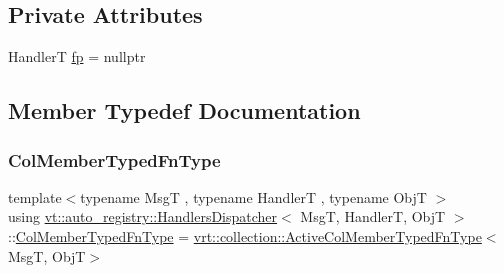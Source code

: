 \subsection*{Private Attributes}
\begin{DoxyCompactItemize}
\item 
HandlerT \hyperlink{structvt_1_1auto__registry_1_1_handlers_dispatcher_a2fe52dbcfedb744c43a0579de7c7167f}{fp} = nullptr
\end{DoxyCompactItemize}


\subsection{Member Typedef Documentation}
\mbox{\label{structvt_1_1auto__registry_1_1_handlers_dispatcher_a6f1a72ba3eec14527af044a478416b4d}} 
\subsubsection{\texorpdfstring{Col\+Member\+Typed\+Fn\+Type}{ColMemberTypedFnType}}
{\footnotesize\ttfamily template$<$typename MsgT , typename HandlerT , typename ObjT $>$ \\
using \hyperlink{structvt_1_1auto__registry_1_1_handlers_dispatcher}{vt\+::auto\+\_\+registry\+::\+Handlers\+Dispatcher}$<$ MsgT, HandlerT, ObjT $>$\+::\hyperlink{structvt_1_1auto__registry_1_1_handlers_dispatcher_a6f1a72ba3eec14527af044a478416b4d}{Col\+Member\+Typed\+Fn\+Type} =  \hyperlink{namespacevt_1_1vrt_1_1collection_a87925616c03cf4ccc548d33b2fe172ee}{vrt\+::collection\+::\+Active\+Col\+Member\+Typed\+Fn\+Type}$<$MsgT, ObjT$>$}

\mbox{\label{structvt_1_1auto__registry_1_1_handlers_dispatcher_aa2e8b80baa4dffdd9b2476ca9d2a7b46}} 

